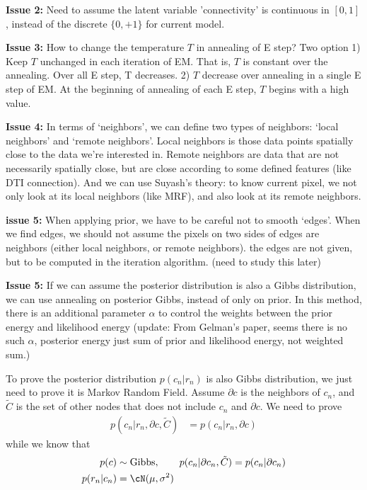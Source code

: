 \documentclass[12pt]{article}
\begin{document}
\textbf{Issue 2: }Need to assume the latent variable 'connectivity' is continuous in $[0, 1]$, instead of the discrete $\{0, +1\}$ for current model. 

\textbf{Issue 3: } How to change the temperature $T$ in annealing of E step? Two option 1) Keep $T$ unchanged in each iteration of EM. That is, $T$ is constant over the annealing. Over all E step, T decreases.  2) $T$ decrease over annealing in a single E step of EM. At the beginning of annealing of each E step, $T$ begins with a high value. 

\textbf{Issue 4: } In terms of `neighbors', we can define two types of neighbors: `local neighbors' and `remote neighbors'. Local neighbors is those data points spatially close to the data we're interested in. Remote neighbors are data that are not necessarily spatially close, but are close according to some defined features (like DTI connection). And we can use Suyash's theory: to know current pixel, we not only look at its local neighbors (like MRF), and also look at its remote neighbors.

\textbf{issue 5: } When applying prior, we have to be careful not to smooth `edges'. When we find edges, we should not assume the pixels on two sides of edges are neighbors (either local neighbors, or remote neighbors). the edges are not given, but to be computed in the iteration algorithm. (need to study this later)

\textbf{Issue 5:} If we can assume the posterior distribution is also a Gibbs distribution,  we can use annealing on posterior Gibbs, instead of only on prior. In this method, there is an additional parameter $\alpha$ to control the weights between the prior energy and likelihood energy (update: From Gelman's paper, seems there is no such $\alpha$, posterior energy just sum of prior and likelihood energy, not weighted sum.)

To prove the posterior distribution $p(c_n | r_n)$ is also Gibbs distribution, we just need to prove it is Markov Random Field. Assume $\partial c$ is the neighbors of $c_n$, and $\tilde C$ is the set of other nodes that does not include $c_n$ and $\partial c$. We need to prove 
\begin{align}
p(c_n | r_n, \partial c, \tilde C) &= p(c_n | r_n, \partial c)
\end{align}
while we know that 
\begin{align}
p(c) &\sim \mbox{Gibbs}, \qquad  p(c_n|\partial c_n, \tilde C) = p(c_n | \partial c_n)\\
p(r_n | c_n ) &= \cN(\mu, \sigma^2) \\
\end{align}
\end{document}
